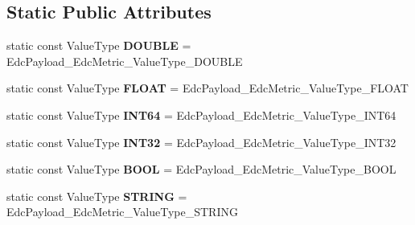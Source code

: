 \subsection*{Static Public Attributes}
\begin{DoxyCompactItemize}
\item 
\hypertarget{classedcdatatypes_1_1_edc_payload___edc_metric_a19bd6dcdd78f3d40f407a2d5cf26b1e6}{static const Value\-Type {\bfseries D\-O\-U\-B\-L\-E} = Edc\-Payload\-\_\-\-Edc\-Metric\-\_\-\-Value\-Type\-\_\-\-D\-O\-U\-B\-L\-E}\label{classedcdatatypes_1_1_edc_payload___edc_metric_a19bd6dcdd78f3d40f407a2d5cf26b1e6}

\item 
\hypertarget{classedcdatatypes_1_1_edc_payload___edc_metric_af3320689022faf609e5c82eda29851ba}{static const Value\-Type {\bfseries F\-L\-O\-A\-T} = Edc\-Payload\-\_\-\-Edc\-Metric\-\_\-\-Value\-Type\-\_\-\-F\-L\-O\-A\-T}\label{classedcdatatypes_1_1_edc_payload___edc_metric_af3320689022faf609e5c82eda29851ba}

\item 
\hypertarget{classedcdatatypes_1_1_edc_payload___edc_metric_a30384e7c2a40ea2250da6b0e19bf8b63}{static const Value\-Type {\bfseries I\-N\-T64} = Edc\-Payload\-\_\-\-Edc\-Metric\-\_\-\-Value\-Type\-\_\-\-I\-N\-T64}\label{classedcdatatypes_1_1_edc_payload___edc_metric_a30384e7c2a40ea2250da6b0e19bf8b63}

\item 
\hypertarget{classedcdatatypes_1_1_edc_payload___edc_metric_a4833af24b65438eaf4e25824c4ca30c8}{static const Value\-Type {\bfseries I\-N\-T32} = Edc\-Payload\-\_\-\-Edc\-Metric\-\_\-\-Value\-Type\-\_\-\-I\-N\-T32}\label{classedcdatatypes_1_1_edc_payload___edc_metric_a4833af24b65438eaf4e25824c4ca30c8}

\item 
\hypertarget{classedcdatatypes_1_1_edc_payload___edc_metric_a99c1104083e08d534a45bec7afabf5cf}{static const Value\-Type {\bfseries B\-O\-O\-L} = Edc\-Payload\-\_\-\-Edc\-Metric\-\_\-\-Value\-Type\-\_\-\-B\-O\-O\-L}\label{classedcdatatypes_1_1_edc_payload___edc_metric_a99c1104083e08d534a45bec7afabf5cf}

\item 
\hypertarget{classedcdatatypes_1_1_edc_payload___edc_metric_a4db88d63d67b2a9fe75876fb34deedca}{static const Value\-Type {\bfseries S\-T\-R\-I\-N\-G} = Edc\-Payload\-\_\-\-Edc\-Metric\-\_\-\-Value\-Type\-\_\-\-S\-T\-R\-I\-N\-G}\label{classedcdatatypes_1_1_edc_payload___edc_metric_a4db88d63d67b2a9fe75876fb34deedca}


\end{DoxyCompactItemize}
